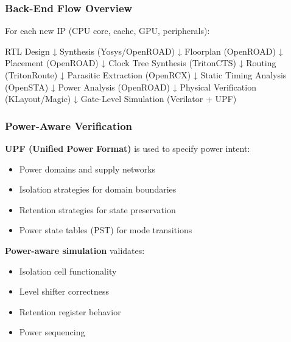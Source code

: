 \subsubsection{Back-End Flow Overview}\label{cr:status:roadmap:back-end-flow-overview}

\begin{record}

For each new IP (CPU core, cache, GPU, peripherals):

\begin{textblock}
RTL Design
    ↓
Synthesis (Yosys/OpenROAD)
    ↓
Floorplan (OpenROAD)
    ↓
Placement (OpenROAD)
    ↓
Clock Tree Synthesis (TritonCTS)
    ↓
Routing (TritonRoute)
    ↓
Parasitic Extraction (OpenRCX)
    ↓
Static Timing Analysis (OpenSTA)
    ↓
Power Analysis (OpenROAD)
    ↓
Physical Verification (KLayout/Magic)
    ↓
Gate-Level Simulation (Verilator + UPF)
\end{textblock}

\end{record}

\subsubsection{Power-Aware Verification}\label{cr:status:roadmap:power-aware-verification}

\begin{record}

\textbf{UPF (Unified Power Format)} is used to specify power intent:

\begin{itemize}
\tightlist
\item
  Power domains and supply networks
\item
  Isolation strategies for domain boundaries
\item
  Retention strategies for state preservation
\item
  Power state tables (PST) for mode transitions
\end{itemize}

\textbf{Power-aware simulation} validates:

\begin{itemize}
\tightlist
\item
  Isolation cell functionality
\item
  Level shifter correctness
\item
  Retention register behavior
\item
  Power sequencing
\end{itemize}

\end{record}

